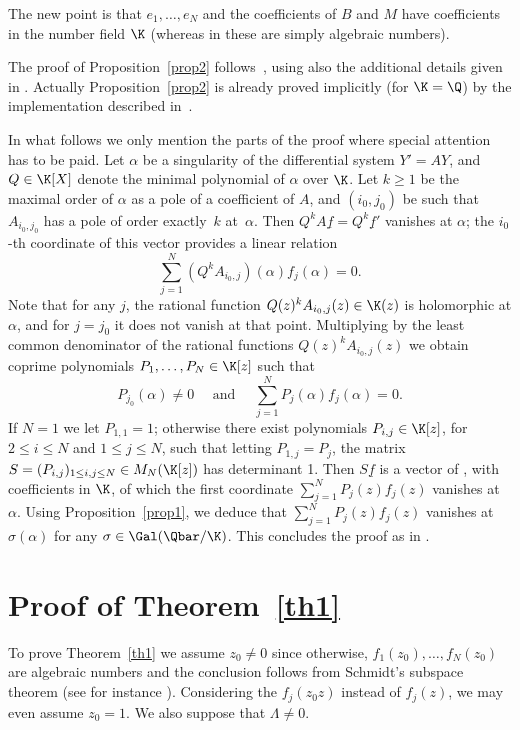 The new point is that $e_1,\ldots,e_N$ and the coefficients of $B$ and $M$ have coefficients in the number field $\K$ (whereas in \cite[Th.\,1.5]{beukers} these are simply algebraic numbers).

The proof of Proposition~\ref{prop2} follows~\cite[p.\,378]{beukers}, using also the additional details given in \cite{BRS2}. Actually Proposition~\ref{prop2} is already proved
implicitly (for $\K=\Q$) by the implementation described in~\cite{BRS2}.

In what follows we only mention the parts of the proof where special attention has to be paid. Let $\alpha$ be a singularity of the differential system $Y'=AY$, and $Q\in\K[X]$ denote the minimal polynomial of $\alpha$ over $\K$. Let $k\geq 1$ be the maximal order of $\alpha$ as a pole of a coefficient of $A$, and $(i_0,j_0)$ be such that $A_{i_0,j_0}$ has a pole of order exactly~$k$ at~$\alpha$. Then $Q^k A\underline f = Q^k \underline f'$ vanishes at $\alpha$; the $i_0$-th coordinate of this vector provides a linear relation
\[
\sum_{j=1}^N (Q^k A_{i_0,j})(\alpha) f_j(\alpha)=0.
\]
Note that for any $j$, the rational function $Q(z)^k A_{i_0,j}(z)\in\K(z)$ is holomorphic at $\alpha$, and for $j=j_0$ it does not vanish at that point. Multiplying by the least common denominator of the rational functions $Q(z)^k A_{i_0,j}(z) $ we obtain coprime polynomials $P_1,\ldots,P_N\in\K[z]$ such that
\[
P_{j_0}(\alpha)\neq 0 \quad \mbox{ and }\quad \sum_{j=1}^N P_j(\alpha) f_j(\alpha)=0.
\]
If $N=1$ we let $P_{1,1}=1$; otherwise there exist polynomials $P_{i,j}\in\K[z]$, for $2\leq i \leq N$ and $1\leq j \leq N$, such that letting $P_{1,j}=P_j$, the matrix $S = (P_{i,j})_{1\leq i,j\leq N}\in M_N(\K[z])$ has determinant 1. Then $S \underline f $ is a vector of \Efunctions, with coefficients in $\K$, of which the first coordinate $ \sum_{j=1}^N P_j(z) f_j(z)$ vanishes at $ \alpha $. Using Proposition~\ref{prop1}, we deduce that $ \sum_{j=1}^N P_j(z) f_j(z)$ vanishes at $\sigma(\alpha)$ for any $\sigma\in\Gal(\Qbar/\K)$. This concludes the proof as in \cite{beukers}.

\section{Proof of Theorem~\ref{th1}} \label{secpreuveth1}

To prove Theorem~\ref{th1} we assume $z_0\neq 0$ since otherwise, $f_1(z_0),\ldots,f_N(z_0)$ are algebraic numbers and the conclusion follows from Schmidt's subspace theorem (see for instance \cite[Ch.\,1, \S 8.2, Th.\,1.37]{EMS}). Considering the \Efunctions $f_j(z_0z)$ instead of $f_j(z)$, we may even assume $z_0=1$. We also suppose that $\Lambda\neq 0$.


